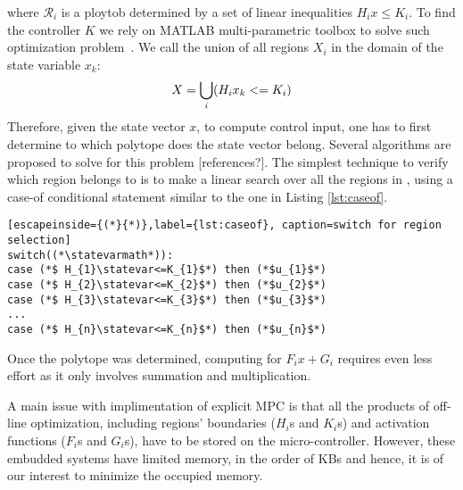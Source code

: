 where $\mathcal{R}_i$ is a ploytob determined by  a set of linear inequalities $H_ix\leq K_i$. To find the controller $K$ we rely on MATLAB multi-parametric toolbox to solve such optimization problem~\cite{matlabMPT, matlabYALMIP}. We call \statespace\space the union of all regions $X_{i}$ in the domain of the state variable $x_{k}$:
\begin{equation}
X = \bigcup_{i}(H_{i}x_{k}<=K_{i})
\end{equation}
Therefore, given the state vector $x$, to compute control input, one has to first determine to which polytope does the state vector belong. Several algorithms are proposed to solve for this problem [references?]. The simplest technique to verify which region \statevarmath belongs to is to make a linear search over all the regions in \statespace\space, using a case-of conditional statement similar to the one in Listing \ref{lst:caseof}.

\begin{lstlisting}[escapeinside={(*}{*)},label={lst:caseof}, caption=switch for region selection]
switch((*\statevarmath*)):
case (*$ H_{1}\statevar<=K_{1}$*) then (*$u_{1}$*)
case (*$ H_{2}\statevar<=K_{2}$*) then (*$u_{2}$*)
case (*$ H_{3}\statevar<=K_{3}$*) then (*$u_{3}$*)
...
case (*$ H_{n}\statevar<=K_{n}$*) then (*$u_{n}$*)
\end{lstlisting}
Once the polytope was determined, computing for $F_ix+G_i$ requires even less effort as it only involves summation and multiplication.  

A main issue with implimentation of explicit MPC is that all the products of off-line optimization, including regions' boundaries ($H_i$s and $K_i$s) and activation functions ($F_i$s and $G_i$s), have to be stored on the micro-controller. However, these embudded systems have limited memory, in the order of KBs and hence, it is of our interest to minimize the occupied memory.